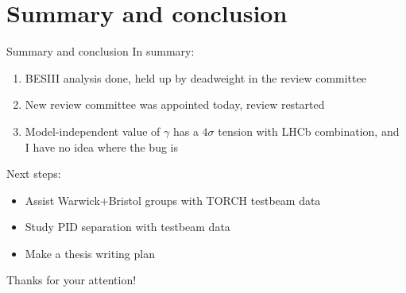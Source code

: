 \documentclass{beamer}
\begin{document}
\section{Summary and conclusion}

\begin{frame}{Summary and conclusion}
  \vspace{0.0cm}
  {\Large In summary:}
  \begin{enumerate}
    \setlength\itemsep{0.5em}
    \item{BESIII analysis done, held up by deadweight in the review committee}
    \item{New review committee was appointed today, review restarted}
    \item{Model-independent value of $\gamma$ has a $4\sigma$ tension with LHCb combination, and I have no idea where the bug is}
  \end{enumerate}
  \vspace{0.4cm}
  {\Large Next steps:}
  \begin{itemize}
    \setlength\itemsep{0.5em}
    \item{Assist Warwick+Bristol groups with TORCH testbeam data}
    \item{Study PID separation with testbeam data}
    \item{Make a thesis writing plan}
  \end{itemize}
  \vspace{0.2cm}
  \begin{center}
    {\Large Thanks for your attention!}
  \end{center}
\end{frame}
\end{document}

